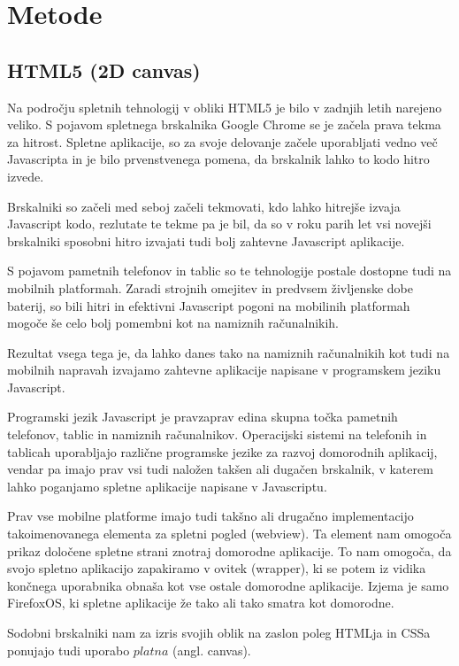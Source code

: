 \chapter{Metode}

\section{HTML5 (2D canvas)\cite{canvas}}

Na področju spletnih tehnologij v obliki HTML5 je bilo v zadnjih letih narejeno veliko. S pojavom spletnega brskalnika Google Chrome se je začela prava tekma za hitrost. Spletne aplikacije, so za svoje delovanje začele uporabljati vedno več Javascripta in je bilo prvenstvenega pomena, da brskalnik lahko to kodo hitro izvede.

Brskalniki so začeli med seboj začeli tekmovati, kdo lahko hitrejše izvaja Javascript kodo, rezlutate te tekme pa je bil, da so v roku parih let vsi novejši brskalniki sposobni hitro izvajati tudi bolj zahtevne Javascript aplikacije. 

S pojavom pametnih telefonov in tablic so te tehnologije postale dostopne tudi na mobilnih platformah. Zaradi strojnih omejitev in predvsem življenske dobe baterij, so bili hitri in efektivni Javascript pogoni na mobilinih platformah mogoče še celo bolj pomembni kot na namiznih računalnikih.

Rezultat vsega tega je, da lahko danes tako na namiznih računalnikih kot tudi na mobilnih napravah izvajamo zahtevne aplikacije napisane v programskem jeziku Javascript. 

Programski jezik Javascript je pravzaprav edina skupna točka pametnih telefonov, tablic in namiznih računalnikov. Operacijski sistemi na telefonih in tablicah uporabljajo različne programske jezike za razvoj domorodnih aplikacij, vendar pa imajo prav vsi tudi naložen takšen ali dugačen brskalnik, v katerem lahko poganjamo spletne aplikacije napisane v Javascriptu.

Prav vse mobilne platforme imajo tudi takšno ali drugačno implementacijo takoimenovanega elementa za spletni pogled (webview). Ta element nam omogoča prikaz določene spletne strani znotraj domorodne aplikacije. To nam omogoča, da svojo spletno aplikacijo zapakiramo v ovitek (wrapper), ki se potem iz vidika končnega uporabnika obnaša kot vse ostale domorodne aplikacije. Izjema je samo FirefoxOS, ki spletne aplikacije že tako ali tako smatra kot domorodne.

Sodobni brskalniki nam za izris svojih oblik na zaslon poleg HTMLja in CSSa ponujajo tudi uporabo $platna$ (angl. canvas). 

